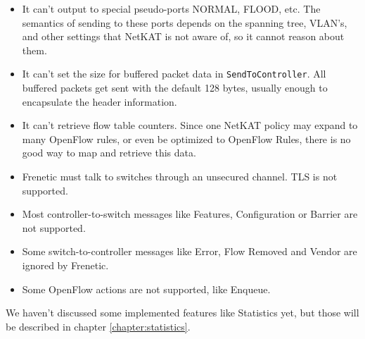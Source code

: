 \begin{itemize}
\item It can't output to special pseudo-ports NORMAL, FLOOD, etc.  The semantics of sending to these ports
depends on the spanning tree, VLAN's, and other settings that NetKAT is not aware of, so it cannot reason
about them. 
\item It can't set the size for buffered packet data in \texttt{SendToController}.  All buffered packets
get sent with the default 128 bytes, usually enough to encapsulate the header information.
\item It can't retrieve flow table counters.  Since one NetKAT policy may expand to many OpenFlow rules, or even 
be optimized to OpenFlow Rules, there is no good way to map and retrieve this data.
\item Frenetic must talk to switches through an unsecured channel.  TLS is not supported.
\item Most controller-to-switch messages like Features, Configuration or Barrier are not supported.
\item Some switch-to-controller messages like Error, Flow Removed and Vendor are ignored by Frenetic. 
\item Some OpenFlow actions are not supported, like Enqueue.   
\end{itemize}

We haven't discussed some implemented features like Statistics yet, but those will be described in chapter \ref{chapter:statistics}.